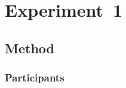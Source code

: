 \documentclass[a4paper,man,natbib,noextraspace]{apa6}
\begin{document}




\section{Experiment~1} %


\subsection{Method}

\subsubsection{Participants}

\end{document}
